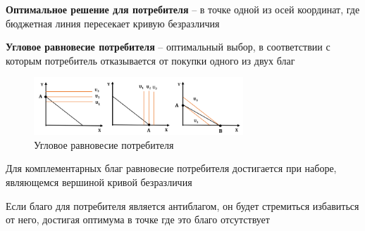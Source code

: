 \documentclass[reqno]{article}
\theoremstyle{definition}
\theoremstyle{definition}
\theoremstyle{definition}
\theoremstyle{definition}
\theoremstyle{definition}
\theoremstyle{definition}
\theoremstyle{definition}
\theoremstyle{definition}
\theoremstyle{definition}
\begin{document}
			\textbf{Оптимальное решение для потребителя} -- в точке одной из осей координат, где бюджетная линия пересекает кривую безразличия
			
			\textbf{Угловое равновесие потребителя} -- оптимальный выбор, в соответствии с которым потребитель отказывается от покупки одного из двух благ
			
			\begin{figure}[h!]
				\centering
				\includegraphics[width=0.7\textwidth]{Угловое_равновесие_потребителя}
				\caption{Угловое равновесие потребителя}
			\end{figure}
			
			Для комплементарных благ равновесие потребителя достигается при наборе, являющемся вершиной кривой безразличия
			
			Если благо для потребителя является антиблагом, он будет стремиться избавиться от него, достигая оптимума в точке где это благо отсутствует
			\newpage
			
	\section{}
\end{document}
